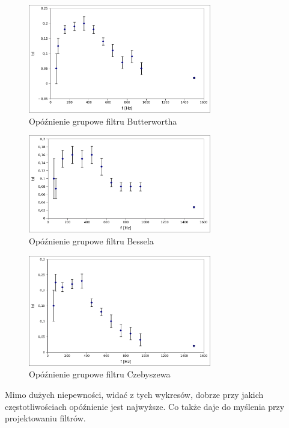 \documentclass[a4paper,11pt]{article}
\begin{document}
\begin{figure}[H]
\begin{center}
\includegraphics[width=8cm]{obrazki/bworw.png}
\end{center}
\caption{Opóźnienie grupowe filtru Butterwortha}
\end{figure}
\begin{figure}[H]
\begin{center}
\includegraphics[width=8cm]{obrazki/bw.png}
\end{center}
\caption{Opóźnienie grupowe filtru Bessela}
\end{figure}
\begin{figure}[H]
\begin{center}
\includegraphics[width=8cm]{obrazki/cw.png}
\end{center}
\caption{Opóźnienie grupowe filtru Czebyszewa}
\end{figure}

Mimo dużych niepewności, widać z tych wykresów, dobrze przy jakich częstotliwościach opóźnienie jest najwyższe. Co także daje do myślenia przy projektowaniu filtrów. 
\end{document}
